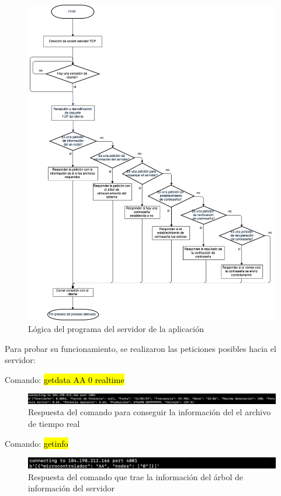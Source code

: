 \begin{figure}[H]
	\centering
	\includegraphics[scale=.4]{Capitulo5/images/logica_server_tcp.png}
	\caption{Lógica del programa del servidor de la aplicación}
	\label{fig:programa del servidor aplicacion}
\end{figure} 

Para probar su funcionamiento, se realizaron las peticiones posibles hacia el servidor:

Comando: \hl{getdata AA 0 realtime}
\begin{figure}[H]
	\centering
	\includegraphics[scale=.3]{Capitulo5/images/get_data.png}
	\caption{Respuesta del comando para conseguir la información del el archivo de tiempo real}
	\label{fig:}
\end{figure} 

Comando: \hl{getinfo}
\begin{figure}[H]
	\centering
	\includegraphics[scale=.5]{Capitulo5/images/get_info.png}
	\caption{Respuesta del comando que trae la información del árbol de información del servidor}
	\label{fig:}
\end{figure} 

